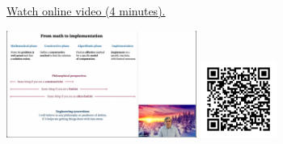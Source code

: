 
\begin{minipage}{10cm}
    \href{https://act4e-spring21.netlify.app/videos/spring2021-functorial-comp-a:solving-codesign.html}{Watch online video (4 minutes).}
        
    \href{https://act4e-spring21.netlify.app/videos/spring2021-functorial-comp-a:solving-codesign.html}{\includegraphics[height=3.5cm]{spring2021-functorial-comp-a:solving-codesign/thumbnails.jpg}}
    \href{https://act4e-spring21.netlify.app/videos/spring2021-functorial-comp-a:solving-codesign.html}{\includegraphics[height=2.5cm]{spring2021-functorial-comp-a:solving-codesign/qrcode.png}}
\end{minipage}
